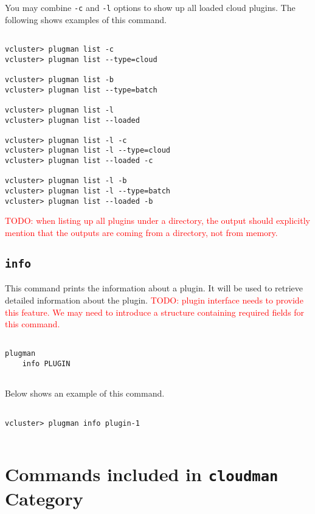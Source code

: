 \documentclass[11pt]{article}
\def \ttt{\texttt}
\def \vb{\verb}
\begin{document}
You may combine \vb+-c+ and \vb+-l+ options to show up all loaded cloud plugins. The following shows examples of this command.

\begin{Verbatim}[fontfamily=courier, fontsize = \small, obeytabs
=true, tabsize=4, frame=lines]

vcluster> plugman list -c
vcluster> plugman list --type=cloud

vcluster> plugman list -b
vcluster> plugman list --type=batch

vcluster> plugman list -l
vcluster> plugman list --loaded

vcluster> plugman list -l -c
vcluster> plugman list -l --type=cloud
vcluster> plugman list --loaded -c

vcluster> plugman list -l -b
vcluster> plugman list -l --type=batch
vcluster> plugman list --loaded -b

\end{Verbatim}

\textcolor{red}{TODO: when listing up all plugins under a directory, the output should explicitly mention that the outputs are coming from a directory, not from memory.}


\subsection{\ttt{info}}
This command prints the information about a plugin. It will be used to retrieve detailed information about the plugin. \textcolor{red}{TODO: plugin interface needs to provide this feature. We may need to introduce a structure containing required fields for this command.}


\begin{Verbatim}[fontfamily=courier, fontsize = \small, obeytabs
=true, tabsize=4, frame=lines]

plugman 
    info PLUGIN
      
\end{Verbatim}

Below shows an example of this command.

\begin{Verbatim}[fontfamily=courier, fontsize = \small, obeytabs
=true, tabsize=4, frame=lines]

vcluster> plugman info plugin-1
      
\end{Verbatim}


\newpage

\section{Commands included in \ttt{cloudman} Category}
\end{document}
